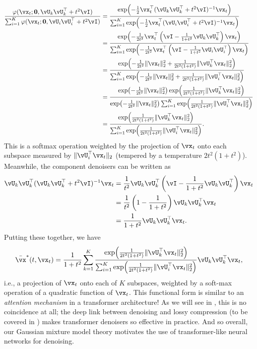 \documentclass[../../book-main.tex]{subfiles}
\begin{document}
\begin{align}
	\frac{\phi(\vx_{t} ; \vzero, \vU_{k}\vU_{k}^{\top} + t^{2}\vI)}{\sum_{i
	= 1}^{K}\phi(\vx_{t} ; \vzero, \vU_{i}\vU_{i}^{\top} + t^{2}\vI)} 
	&= \frac{\exp\rp{-\frac{1}{2}\vx_{t}^{\top}(\vU_{k}\vU_{k}^{\top} + t^{2}\vI)^{-1}\vx_{t}}}{\sum_{i = 1}^{K}\exp\rp{-\frac{1}{2}\vx_{t}^{\top}(\vU_{i}\vU_{i}^{\top} + t^{2}\vI)^{-1}\vx_{t}}} \\
	&= \frac{\exp\rp{-\frac{1}{2t^{2}}\vx_{t}^{\top}\bp{\vI - \frac{1}{1 + t^{2}}\vU_{k}\vU_{k}^{\top}}\vx_{t}}}{\sum_{i = 1}^{K}\exp\rp{-\frac{1}{2t^{2}}\vx_{t}^{\top}\bp{\vI - \frac{1}{1 + t^{2}}\vU_{i}\vU_{i}^{\top}}\vx_{t}}} \\
	&= \frac{\exp\rp{-\frac{1}{2t^{2}}\norm{\vx_{t}}_{2}^{2} + \frac{1}{2t^{2}(1 + t^{2})}\norm{\vU_{k}^{\top}\vx_{t}}_{2}^{2}}}{\sum_{i = 1}^{K}\exp\rp{-\frac{1}{2t^{2}}\norm{\vx_{t}}_{2}^{2} + \frac{1}{2t^{2}(1 + t^{2})}\norm{\vU_{i}^{\top}\vx_{t}}_{2}^{2}}} \\
	&= \frac{\exp\rp{-\frac{1}{2t^{2}}\norm{\vx_{t}}_{2}^{2}}\exp\rp{\frac{1}{2t^{2}(1 + t^{2})}\norm{\vU_{k}^{\top}\vx_{t}}_{2}^{2}}}{\exp\rp{-\frac{1}{2t^{2}}\norm{\vx_{t}}_{2}^{2}}\sum_{i = 1}^{K}\exp\rp{\frac{1}{2t^{2}(1 + t^{2})}\norm{\vU_{i}^{\top}\vx_{t}}_{2}^{2}}} \\
	&= \frac{\exp\rp{\frac{1}{2t^{2}(1 + t^{2})}\norm{\vU_{k}^{\top}\vx_{t}}_{2}^{2}}}{\sum_{i = 1}^{K}\exp\rp{\frac{1}{2t^{2}(1 + t^{2})}\norm{\vU_{i}^{\top}\vx_{t}}_{2}^{2}}}.
\end{align}
This is a softmax operation weighted by the projection of \(\vx_{t}\) onto each subspace measured by \(\norm{\vU_{i}^{\top}\vx_{t}}_{2}\) (tempered by a temperature \(2t^{2}(1 + t^{2})\)). Meanwhile, the component denoisers can be written as 
\begin{align}
	\vU_{k}\vU_{k}^{\top}(\vU_{k}\vU_{k}^{\top} + t^{2}\vI)^{-1}\vx_{t} 
	&= \frac{1}{t^{2}}\vU_{k}\vU_{k}^{\top}\bp{\vI - \frac{1}{1 + t^{2}}\vU_{k}\vU_{k}^{\top}}\vx_{t} \\
	&= \frac{1}{t^{2}}\bp{1 - \frac{1}{1 + t^{2}}}\vU_{k}\vU_{k}^{\top}\vx_{t} \\
	&= \frac{1}{1 + t^{2}}\vU_{k}\vU_{k}^{\top}\vx_{t}.
\end{align}
Putting these together, we have 
\begin{equation}\label{eq:gmm_lowrank_denoiser}
	\bar{\vx}^{\ast}(t, \vx_{t}) = \frac{1}{1 + t^{2}}\sum_{k = 1}^{K}\frac{\exp\rp{\frac{1}{2t^{2}(1 + t^{2})}\norm{\vU_{k}^{\top}\vx_{t}}_{2}^{2}}}{\sum_{i = 1}^{K}\exp\rp{\frac{1}{2t^{2}(1 + t^{2})}\norm{\vU_{i}^{\top}\vx_{t}}_{2}^{2}}}\vU_{k}\vU_{k}^{\top}\vx_{t},
\end{equation}
i.e., a projection of \(\vx_{t}\) onto each of \(K\) subspaces, weighted by a soft-max operation of a quadratic function of \(\vx_{t}\). This functional form is similar to an \textit{attention mechanism} in a transformer architecture! As we will see in , this is no coincidence at all; the deep link between denoising and lossy compression (to be covered in ) makes transformer denoisers so effective in practice. And so overall, our Gaussian mixture model theory motivates the use of transformer-like neural networks for denoising.
\end{document}
